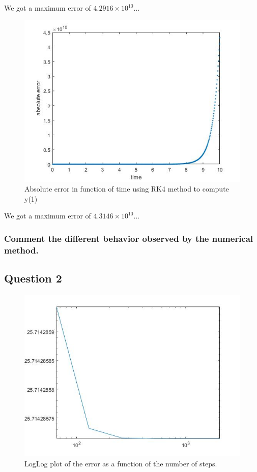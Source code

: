 \documentclass[a4paper, 11pt]{article}
\begin{document}
	We got a maximum error of $4.2916 \times 10^{10}$...
	
	\begin{figure}[H]
		\centering
		\includegraphics[width=\linewidth]{ex1_rk4.jpg}
		\caption{Absolute error in function of time using RK4 method to compute y(1)}
		\label{fig:ex1_rk4}
	\end{figure}
	
	We got a maximum error of $4.3146 \times 10^{10}$...
	
	\subsubsection*{Comment the different behavior observed by the numerical method.}
		
	
	\subsection*{Question 2}
	\begin{figure}[H]
		\centering
		\includegraphics[width=\linewidth]{ex2.jpg}
		\caption{LogLog plot of the error as a function of the number of steps.}
		\label{fig:ex2}
	\end{figure}
	
\end{document}
